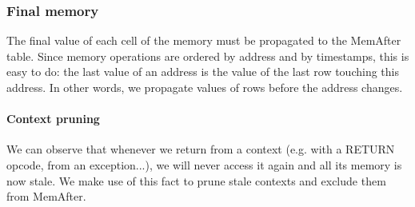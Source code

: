 \subsubsection{Final memory}
\label{final-memory}

The final value of each cell of the memory must be propagated to the MemAfter table. Since memory operations are ordered by address and by timestamps, this is
easy to do: the last value of an address is the value of the last row touching this address. In other words, we propagate values of rows before the address changes.

\paragraph*{Context pruning}
\label{context-pruning}

We can observe that whenever we return from a context (e.g. with a RETURN opcode, from an exception...), we will never access it again and all its memory is now stale.
We make use of this fact to prune stale contexts and exclude them from MemAfter.


